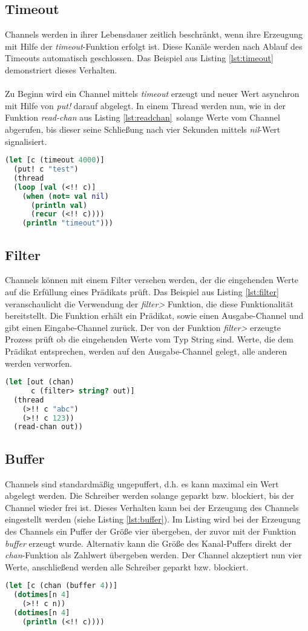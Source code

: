 \subsection{Timeout}
Channels werden in ihrer Lebensdauer zeitlich beschränkt, wenn ihre Erzeugung mit Hilfe der \textit{timeout}-Funktion erfolgt ist. Diese Kanäle werden nach Ablauf des Timeouts automatisch geschlossen. Das Beispiel aus Listing \ref{lst:timeout} demonstriert dieses Verhalten.\\
\\
Zu Beginn wird ein Channel mittels \textit{timeout} erzeugt und neuer Wert asynchron mit Hilfe von \textit{put!} darauf abgelegt. In einem Thread werden nun, wie in der Funktion \textit{read-chan} aus Listing \ref{lst:readchan}\ solange Werte vom Channel abgerufen, bis dieser seine Schließung nach vier Sekunden mittels \textit{nil}-Wert signalisiert.
\begin{lstlisting}[language=Clojure,caption=Timeout,label=lst:timeout]
(let [c (timeout 4000)]
  (put! c "test")
  (thread
  (loop [val (<!! c)]
    (when (not= val nil)
      (println val)
      (recur (<!! c))))
    (println "timeout")))
\end{lstlisting}
\subsection{Filter}
Channels können mit einem Filter versehen werden, der die eingehenden Werte auf die Erfüllung eines Prädikats prüft. Das Beispiel aus Listing \ref{lst:filter} veranschaulicht die Verwendung der \textit{filter>} Funktion, die diese Funktionalität bereitstellt. Die Funktion erhält ein Prädikat, sowie einen Ausgabe-Channel und gibt einen Eingabe-Channel zurück. Der von der Funktion \textit{filter>} erzeugte Prozess prüft ob die eingehenden Werte vom Typ String sind. Werte, die dem Prädikat entsprechen, werden auf den Ausgabe-Channel gelegt, alle anderen werden verworfen.

\begin{lstlisting}[language=Clojure,caption=Filter,label=lst:filter]
(let [out (chan)
      c (filter> string? out)]
  (thread
    (>!! c "abc")
    (>!! c 123))
  (read-chan out))
\end{lstlisting}
\subsection{Buffer}
Channels sind standardmäßig ungepuffert, d.h. es kann maximal ein Wert abgelegt werden. Die Schreiber werden solange geparkt bzw. blockiert, bis der Channel wieder frei ist. Dieses Verhalten kann bei der Erzeugung des Channels eingestellt werden (siehe Listing \ref{lst:buffer}). Im Listing wird bei der Erzeugung des Channels ein Puffer der Größe vier übergeben, der zuvor mit der Funktion \textit{buffer} erzeugt wurde. Alternativ kann die Größe des Kanal-Puffers direkt der \textit{chan}-Funktion als Zahlwert übergeben werden. Der Channel akzeptiert nun vier Werte, anschließend werden alle Schreiber geparkt bzw. blockiert.
\begin{lstlisting}[language=Clojure,caption=Buffer,label=lst:buffer]
(let [c (chan (buffer 4))]
  (dotimes[n 4]
    (>!! c n))
  (dotimes[n 4]
    (println (<!! c))))
\end{lstlisting}
\acresetall
